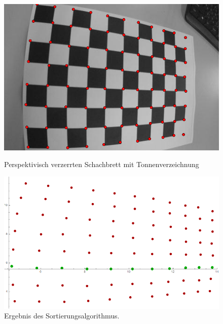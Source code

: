 \begin{figure}[!htb]
	\includegraphics[width=\linewidth]{images/Tonnenverzeichnung_Perspektivisch.png}
	\caption[Perspektivisch verzerrtes Schachbrett mit Tonnenverzeichnung]{Perspektivisch verzerrten Schachbrett mit Tonnenverzeichnung}
	\label{fig:Extreme7}
	\endminipage\hfill
	\includegraphics[width=\linewidth]{images/Tonnenverzeichnung_Perspektivisch_Alg.png}
	\caption[Sortieret Punkte eines perspektivisch verzerrten Schachbretts mit Tonnenverzeichnung]{Ergebnis des Sortierungsalgorithmus.}
	\label{fig:Extreme8}
	\endminipage\hfill
\end{figure}

